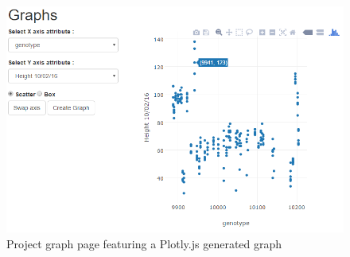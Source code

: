 \begin{figure}[H]
    \centering
    \includegraphics[width=\textwidth]{images/design/plotly}
    \caption{Project graph page featuring a Plotly.js generated graph}
    \label{fig:plotly}
\end{figure} 
